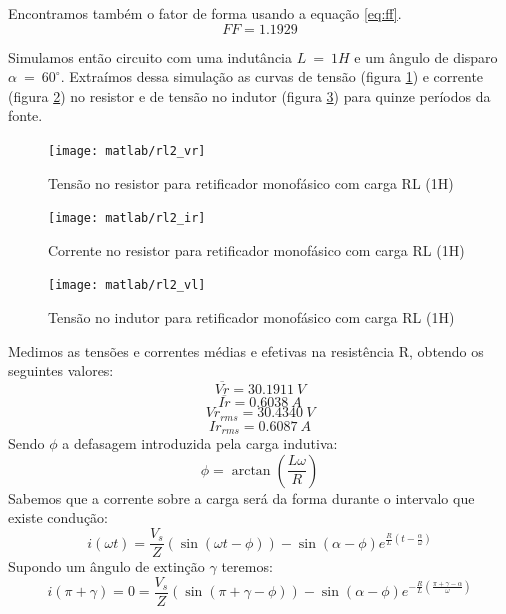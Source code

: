 \documentclass{article}
\begin{document}
Encontramos também o fator de forma usando a equação \ref{eq:ff}.
\begin{equation}
FF = 1.1929
\end{equation}

Simulamos então circuito com uma indutância $L\ =\ 1H$ e um ângulo de disparo $\alpha\ =\ 60^\circ$. Extraímos dessa simulação as curvas de tensão (figura \ref{fig:rl2vr}) e corrente (figura \ref{fig:rl2ir}) no resistor e de tensão no indutor (figura \ref{fig:rl2vl}) para quinze períodos da fonte.
\begin{figure}[H]
	\centering
	\texttt{[image: matlab/rl2\_vr]}
	\caption{Tensão no resistor para retificador monofásico com carga RL (1H)}
	\label{fig:rl2vr}
\end{figure}
\begin{figure}[H]
	\centering
	\texttt{[image: matlab/rl2\_ir]}
	\caption{Corrente no resistor para retificador monofásico com carga RL (1H)}
	\label{fig:rl2ir}
\end{figure}
\begin{figure}[H]
	\centering
	\texttt{[image: matlab/rl2\_vl]}
	\caption{Tensão no indutor para retificador monofásico com carga RL (1H)}
	\label{fig:rl2vl}
\end{figure}
Medimos as tensões e correntes médias e efetivas na resistência R, obtendo os seguintes valores:
\begin{equation}
\overline{Vr} = 30.1911\ V
\end{equation}
\begin{equation}
\overline{Ir} =  0.6038\ A
\end{equation}
\begin{equation}
Vr_{rms} =  30.4340\ V
\end{equation}
\begin{equation}
Ir_{rms} =    0.6087\ A
\end{equation}
Sendo $\phi$ a defasagem introduzida pela carga indutiva:
\begin{equation}
	\phi = \arctan{(\frac{L\omega}{R})}
\end{equation}
Sabemos que a corrente sobre a carga será da forma durante o intervalo que existe condução:
\begin{equation}
	i(\omega t) = \frac{V_s}{Z}(\sin(\omega t - \phi)) - \sin(\alpha - \phi)e^{\frac{R}{L}(t - \frac{\alpha}{\omega})}
\end{equation}
Supondo um ângulo de extinção $\gamma$ teremos:
\begin{equation}
i(\pi + \gamma) = 0 = \frac{V_s}{Z}(\sin(\pi + \gamma - \phi)) - \sin(\alpha - \phi)e^{-\frac{R}{L}(\frac{\pi + \gamma - \alpha}{\omega})}
\end{equation}
\end{document}
